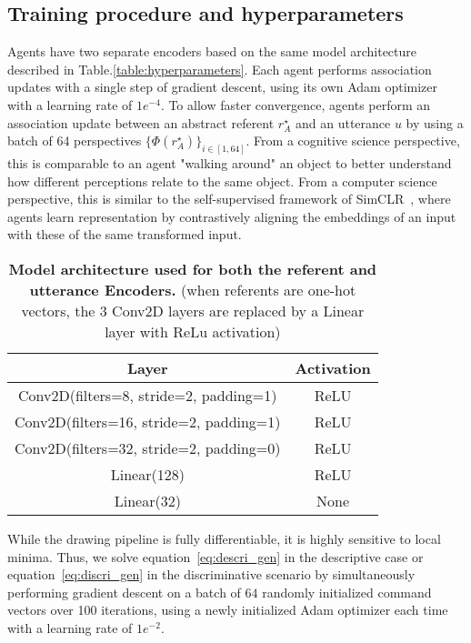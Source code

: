 \newpage
\subsection{Training procedure and hyperparameters}
\label{sup:training_proc}
Agents have two separate encoders based on the same model architecture described in Table.\ref{table:hyperparameters}. Each agent performs association updates with a single step of gradient descent, using its own Adam optimizer with a learning rate of $1e^{-4}$. To allow faster convergence, agents perform an association update between an abstract referent $r^\star_A$ and an utterance $u$ by using a batch of 64 perspectives $\{\Phi(r^\star_A)\}_{i \in [1,64]}$. From a cognitive science perspective, this is comparable to an agent "walking around" an object to better understand how different perceptions relate to the same object. From a computer science perspective, this is similar to the self-supervised framework of SimCLR~\citep{Chen2020ASF}, where agents learn representation by contrastively aligning the embeddings of an input with these of the same transformed input.

\begin{table}[h!]
\centering 

\def\arraystretch{1.5}
\begin{tabular}{ |c|c|} 
 \hline
 \textbf{Layer} & \textbf{Activation}\\
 \hline
 Conv2D(filters=8, stride=2, padding=1) & ReLU\\ 
 \hline
 Conv2D(filters=16, stride=2, padding=1) & ReLU\\ 
 \hline
 Conv2D(filters=32, stride=2, padding=0) & ReLU\\ 
 \hline
 Linear(128) & ReLU\\
 \hline
 Linear(32) & None\\
 \hline
\end{tabular}

\caption{\textbf{Model architecture used for both the referent and utterance Encoders.} (when referents are one-hot vectors, the 3 Conv2D layers are replaced by a Linear layer with ReLu activation)}

\label{table:curves_hyperparams}
\end{table}

While the drawing pipeline is fully differentiable, it is highly sensitive to local minima. Thus, we solve equation~\ref{eq:descri_gen} in the descriptive case or equation~\ref{eq:discri_gen} in the discriminative scenario by simultaneously performing gradient descent on a batch of $64$ randomly initialized command vectors over 100 iterations, using a newly initialized Adam optimizer each time with a learning rate of $1e^{-2}$.

